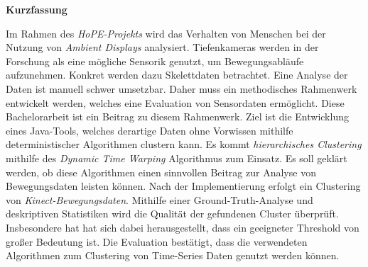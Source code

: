 \vspace*{2cm}

\begin{center}
    \textbf{Kurzfassung}
\end{center}

\vspace*{1cm}

\noindent
Im Rahmen des \emph{HoPE-Projekts} wird das Verhalten von Menschen
bei der Nutzung von \emph{Ambient Displays} analysiert.
Tiefenkameras werden in der Forschung als eine mögliche Sensorik genutzt,
um Bewegungsabläufe aufzunehmen.
Konkret werden dazu Skelettdaten betrachtet.
Eine Analyse der Daten ist manuell schwer umsetzbar.
Daher muss ein methodisches Rahmenwerk entwickelt werden,
welches eine Evaluation von Sensordaten ermöglicht.
Diese Bachelorarbeit ist ein Beitrag zu diesem Rahmenwerk.
Ziel ist die Entwicklung eines Java-Tools,
welches derartige Daten ohne Vorwissen mithilfe deterministischer Algorithmen clustern kann.
Es kommt \emph{hierarchisches Clustering}
mithilfe des \emph{Dynamic Time Warping} Algorithmus zum Einsatz.
Es soll geklärt werden,
ob diese Algorithmen einen sinnvollen Beitrag zur Analyse von Bewegungsdaten leisten können.
Nach der Implementierung erfolgt ein Clustering von \emph{Kinect-Bewegungsdaten}.
Mithilfe einer Ground-Truth-Analyse und deskriptiven Statistiken
wird die Qualität der gefundenen Cluster überprüft.
Insbesondere hat hat sich dabei herausgestellt, dass ein geeigneter Threshold von großer Bedeutung ist.
Die Evaluation bestätigt, dass die verwendeten Algorithmen zum Clustering
von Time-Series Daten genutzt werden können.